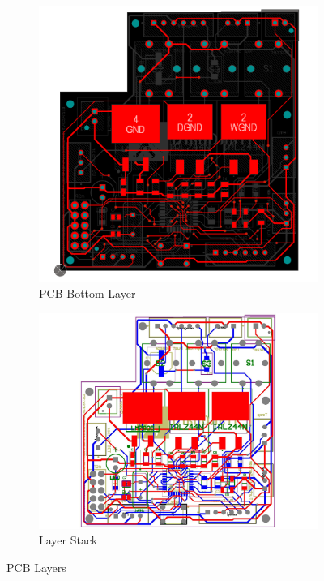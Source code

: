 \documentclass[a4paper,11pt]{article}%
\begin{document}
\begin{figure}[!h]
\begin{subfigure}[b]{0.27\textwidth}
        \includegraphics[width=\textwidth]{./figures/PCBTopLayer.png}
        \caption{PCB Bottom  Layer}
        \label{fig:image3}
    \end{subfigure}
    \begin{subfigure}[b]{0.36\textwidth}
        \centering
        \includegraphics[width=\textwidth]{./figures/BoardStack.jpg}
        \caption{Layer Stack}
        \label{fig:image1}
    \end{subfigure}
    \hfill
    \caption{PCB Layers}
    \label{fig:threeimages}
\end{figure}
\end{document}
